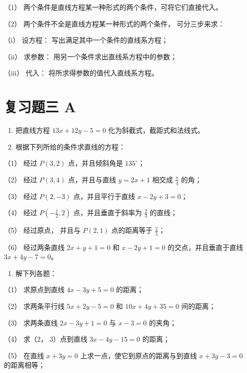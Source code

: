 （1） 两个条件是直线方程某一种形式的两个条件，可将它们直接代入。

（2） 两个条件不全是直线方程某一种形式的两个条件， 可分三步来求：

（i） 设方程： 写出满足其中一个条件的直线系方程；

（ii） 求参数： 用另一个条件求出直线系方程中的参数；

（iii） 代入： 将所求得参数的值代入直线系方程。

\section{复习题三 A}\label{ux590dux4e60ux9898ux4e09-a}

\begin{enumerate}
\def\labelenumi{\arabic{enumi}.}
\item
  把直线方程 \(13x + 12y - 5 = 0\) 化为斜截式，截距式和法线式。
\item
  根据下列所给的条件求直线的方程：
\end{enumerate}

（1） 经过 \(P(3,2)\) 点，并且倾斜角是 \(135^{\circ}\)；

（2） 经过 \(P(3, 4)\) 点，并且与直线 \(y = 2x + 1\) 相交成
\(\frac{\pi}{4}\) 的角；

（3） 经过 \(P(2, -3)\) 点，并且平行于直线 \(x - 2y + 3 = 0\)；

（4） 经过 \(P\left(-\frac{1}{2}, 2\right)\) 点，并且垂直于斜率为
\(\frac{2}{3}\) 的直线；

（5） 经过原点， 并且与 \(P(2, 1)\) 点的距离等于 \(\frac{2}{5}\)；

（6） 经过两条直线 \(2x + y + 1 = 0\) 和 \(x - 2y + 1 = 0\)
的交点，并且垂直于直线 \(3x + 4y - 7 = 0\)。

\begin{enumerate}
\def\labelenumi{\arabic{enumi}.}
\setcounter{enumi}{7}
\tightlist
\item
  解下列各题：
\end{enumerate}

（1） 求原点到直线 \(4x - 3y + 5 = 0\) 的距离；

（2） 求两条平行线 \(5x + 2y - 5 = 0\) 和 \(10x + 4y + 35 = 0\)
间的距离；

（3） 求两条直线 \(2x - 3y + 1 = 0\) 与 \(x - 3 = 0\) 的夹角；

（4） 求（2， 3）点到直线 \(3x - 4y - 15 = 0\) 的距离；

（5） 在直线 \(x + 3y = 0\) 上求一点，使它到原点的距离与到直线
\(x + 3y - 3 = 0\) 的距离相等；

